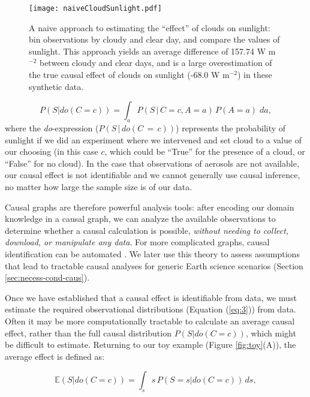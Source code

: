 \documentclass[12pt]{article}
\begin{document}
\begin{figure} \texttt{[image: naiveCloudSunlight.pdf]}
  \caption{A naive approach to estimating the ``effect'' of clouds on
    sunlight: bin observations by cloudy and clear day, and compare the
    values of sunlight. This approach yields an average difference of
    157.74 W m$^{-2}$ between cloudy and clear days, and is a large
    overestimation of the true causal effect of clouds on sunlight (-68.0
    W m$^{-2}$) in these synthetic data.}
  \label{fig:naive-cloud-sunlight}
\end{figure}

\begin{equation} P(S | do(C = c)) = \int_{a} P(S \, | \, C = c, A=a)
  \, P(A=a) \; da,
  \label{eq:3}
\end{equation} where the \textit{do}-expression ($P(S \, | \, do(C\, = \,c))$) represents the probability of sunlight
if we did an experiment where we intervened and set cloud to a value
of our choosing (in this case $c$, which could be ``True'' for the
presence of a cloud, or ``False'' for no cloud). In the case that observations of aerosols are not available, our causal effect is not identifiable and
we cannot generally use causal inference, no matter how large the
sample size is of our data.

Causal graphs are therefore powerful analysis tools: after encoding
our domain knowledge in a causal graph, we can analyze the available
observations to determine whether a causal calculation is possible,
\textit{without needing to collect, download, or manipulate any
  data}. For more complicated graphs, causal identification can be
automated \citep[][ and \url{http://www.dagitty.net/},
\url{https://causalfusion.net}]{tian2002general,shpitser2006,huang2006identifiability,Bareinboim7345,
  textor2017}. We later use this theory to assess assumptions that
lead to tractable causal analyses for generic Earth science scenarios
(Section \ref{sec:necess-cond-caus}).

Once we have established that a causal effect is identifiable from
data, we must estimate the required observational distributions
(Equation (\ref{eq:3})) from data. Often it may be more
computationally tractable to calculate an average causal effect,
rather than the full causal distribution $P(S | do(C=c))$, which might be difficult to estimate. Returning
to our toy example (Figure \ref{fig:toy}(A)), the average effect is
defined as:

\begin{equation} \mathbb{E}(S | do(C = c)) = \int_{s} s \, P(S = s |
  do(C=c)) \, ds,
  \label{eq:4}
\end{equation}
\end{document}
